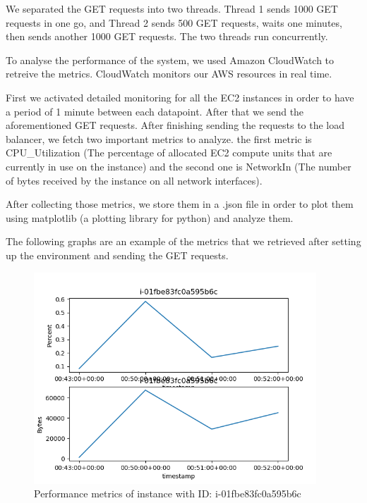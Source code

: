 \documentclass[12pt]{article}
\begin{document}
We separated the GET requests into two threads. Thread 1 sends 1000 GET requests in one go, and Thread 2 sends 500 GET requests, waits one minutes, then sends another 1000 GET requests. The two threads run concurrently.\vspace{1em}

To analyse the performance of the system, we used Amazon CloudWatch to retreive the metrics. CloudWatch monitors our AWS resources in real time.\vspace{1em}

First we activated detailed monitoring for all the EC2 instances in order to have a period of 1 minute between each datapoint. After that we send the aforementioned GET requests. After finishing sending the requests to the load balancer, we fetch two important metrics to analyze. the first metric is CPU\_Utilization (The percentage of allocated EC2 compute units that are currently in use on the instance) and the second one is NetworkIn (The number of bytes received by the instance on all network interfaces).\vspace{1em}

After collecting those metrics, we store them in a .json file in order to plot them using matplotlib (a plotting library for python) and analyze them.\vspace{1em}

The following graphs are an example of the metrics that we retrieved after setting up the environment and sending the GET requests.\vspace{7em}

\begin{figure}[htbp]
\centering
  \includegraphics[height=300px]{i-01fbe83fc0a595b6c.png}
  \caption{Performance metrics of instance with ID: i-01fbe83fc0a595b6c}
\end{figure}
\end{document}
